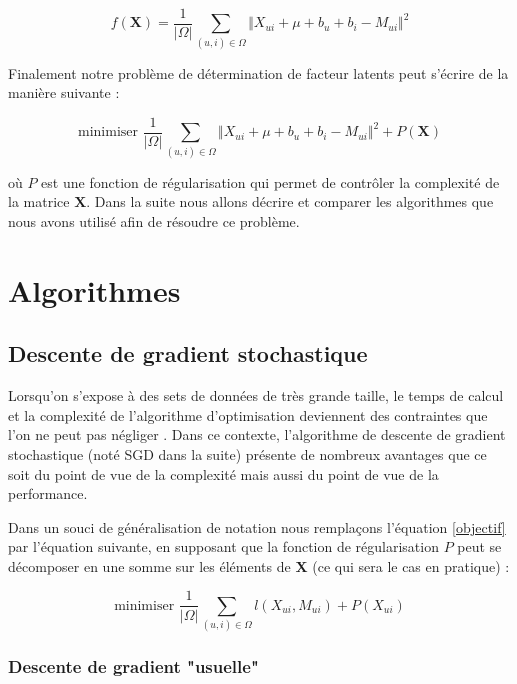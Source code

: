 \documentclass[10pt,a4paper]{article}
\begin{document}
$$ f(\textbf{X}) = \frac{1}{| \Omega |}\sum_{(u,i)\in\Omega}\Vert X_{ui}+\mu + b_u  + b_i-M_{ui} \Vert^2 $$

Finalement notre problème de détermination de facteur latents peut s'écrire de la manière suivante :

\begin{equation}
\label{objectif}
 \text{minimiser } \frac{1}{| \Omega |}\sum_{(u,i)\in\Omega}\Vert X_{ui}+\mu + b_u  + b_i-M_{ui} \Vert^2 + P(\textbf{X})
\end{equation}


où $P$ est une fonction de régularisation qui permet de contrôler la complexité de la matrice $\textbf{X}$. Dans la suite nous allons décrire et comparer les algorithmes que nous avons utilisé afin de résoudre ce problème.

\section{Algorithmes}

\subsection{Descente de gradient stochastique}


Lorsqu'on s'expose à des sets de données de très grande taille, le temps de calcul et la complexité de l'algorithme d'optimisation deviennent des contraintes que l'on ne peut pas négliger \cite{bottouSGD} \cite{bottou}. Dans ce contexte, l'algorithme de descente de gradient stochastique (noté SGD dans la suite) présente de nombreux avantages que ce soit du point de vue de la complexité mais aussi du point de vue de la performance.

Dans un souci de généralisation de notation nous remplaçons l'équation \eqref{objectif} par l'équation suivante, en supposant que la fonction de régularisation $P$ peut se décomposer en une somme sur les éléments de \textbf{X} (ce qui sera le cas en pratique) :

\begin{equation}
\label{objectif2}
 \text{minimiser } \frac{1}{| \Omega |}\sum_{(u,i)\in\Omega}l(X_{ui},M_{ui}) + P(X_{ui})
\end{equation}

\subsubsection*{Descente de gradient "usuelle"}
\end{document}
